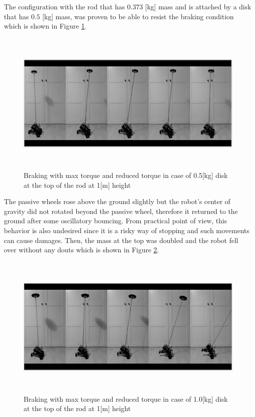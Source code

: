 \documentclass[12pt,english]{article}
\begin{document}
The configuration with the rod that has $0.373$ [kg] mass and is attached by a disk that has $0.5$ [kg] mass, was proven to be able to resist the braking condition which is shown in Figure \ref{fallover_video_05kg}.
\begin{figure}[htb!]
	\centering
	\includegraphics[height=7cm]{figures/fallover_video_05kg.png}
	\caption{Braking with max torque and reduced torque in case of 0.5[kg] disk at the top of the rod at 1[m] height}
	\label{fallover_video_05kg}
\end{figure}
 The passive wheels rose above the ground slightly but the robot's center of gravity did not rotated beyond the passive wheel, therefore it returned to the ground after some oscillatory bouncing. From practical point of view, this behavior is also undesired since it is a risky way of stopping and such movements can cause damages. Then, the mass at the top was doubled and the robot fell over without any douts which is shown in Figure \ref{fallover_video_1kg}. 
 \begin{figure}[htb!]
 	\centering
 	\includegraphics[height=7cm]{figures/fallover_video_1kg.png}
 	\caption{Braking with max torque and reduced torque in case of 1.0[kg] disk at the top of the rod at 1[m] height}
 	\label{fallover_video_1kg}
 \end{figure}
\end{document}
